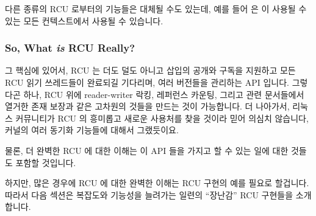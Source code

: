 다른 종류의 RCU 로부터의 기능들은 대체될 수도 있는데, 예를 들어
 은  이 사용될 수 있는 모든
컨텍스트에서 사용될 수 있습니다.
\iffalse

Figure~\ref{fig:defer:RCU API Usage Constraints}
shows which APIs may be used in which in-kernel environments.
The RCU read-side primitives may be used in any environment, including NMI,
the RCU mutation and asynchronous grace-period primitives may be used in any
environment other than NMI, and, finally, the RCU synchronous grace-period
primitives may be used only in process context.
The RCU list-traversal primitives include \co{list_for_each_entry_rcu()},
\co{hlist_for_each_entry_rcu()}, etc.
Similarly, the RCU list-mutation primitives include
\co{list_add_rcu()}, \co{hlist_del_rcu()}, etc.

Note that primitives from other families of RCU may be substituted,
for example, \co{srcu_read_lock()} may be used in any context
in which \co{rcu_read_lock()} may be used.
\fi

\subsubsection{So, What \emph{is} RCU Really?}
\label{sec:defer:So, What is RCU Really?}

그 핵심에 있어서, RCU 는 더도 덜도 아니고 삽입의 공개와 구독을 지원하고 모든
RCU 읽기 쓰레드들이 완료되길 기다리며, 여러 버전들을 관리하는 API 입니다.
그렇다곤 하나, RCU 위에 reader-writer 락킹, 레퍼런스 카운팅, 그리고 관련
문서들에서 열거한 존재 보장과 같은 고차원의 것들을 만드는 것이 가능합니다.
더 나아가서, 리눅스 커뮤니티가 RCU 의 흥미롭고 새로운 사용처를 찾을 것이라 믿어
의심치 않습니다, 커널의 여러 동기화 기능들에 대해서 그랬듯이요.

물론, 더 완벽한 RCU 에 대한 이해는 이 API 들을 가지고 할 수 있는 일에 대한
것들도 포함할 것입니다.

하지만, 많은 경우에 RCU 에 대한 완벽한 이해는 RCU 구현의 예를 필요로 할겁니다.
따라서 다음 섹션은 복잡도와 기능성을 늘려가는 일련의 ``장난감'' RCU 구현들을
소개합니다.
\iffalse

At its core, RCU is nothing more nor less than an API that supports
publication and subscription for insertions, waiting for all RCU readers
to complete, and maintenance of multiple versions.
That said, it is possible to build higher-level constructs
on top of RCU, including the reader-writer-locking, reference-counting,
and existence-guarantee constructs listed in
Section~\ref{sec:defer:RCU Usage}.
Furthermore, I have no doubt that the Linux community will continue to
find interesting new uses for RCU,
just as they do for any of a number of synchronization
primitives throughout the kernel.

Of course, a more-complete view of RCU would also include
all of the things you can do with these APIs.

However, for many people, a complete view of RCU must include sample
RCU implementations.
The next section therefore presents a series of ``toy'' RCU implementations
of increasing complexity and capability.
\fi
